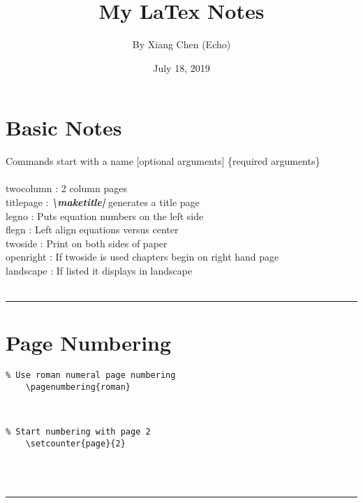 \documentclass[a4paper,12pt,titlepage]{article}
\begin{document}
\title{\Large{\textbf{My LaTex Notes}}}
\author{By Xiang Chen (Echo)}
\date{July 18, 2019}
\maketitle
\tableofcontents
\newpage



\section{Basic Notes}
Commands start with a name [optional arguments] \{required arguments\}
\\
\\twocolumn : 2 column pages
\\titlepage : \emph{\textbf{\textbackslash maketitle|}} generates a title page
\\legno : Puts equation numbers on the left side
\\flegn : Left align equations versus center
\\twoside : Print on both sides of paper
\\openright : If twoside is used chapters begin on right hand page
\\landscape : If listed it displays in landscape
\\
\\
\rule{\linewidth}{0.1mm}






\section{Page Numbering}
\begin{lstlisting}
% Use roman numeral page numbering
	\pagenumbering{roman}
\end{lstlisting}
~\\
\begin{lstlisting}
% Start numbering with page 2
	\setcounter{page}{2}
\end{lstlisting}
~\\
\\
\rule{\linewidth}{0.1mm}


\end{document}
